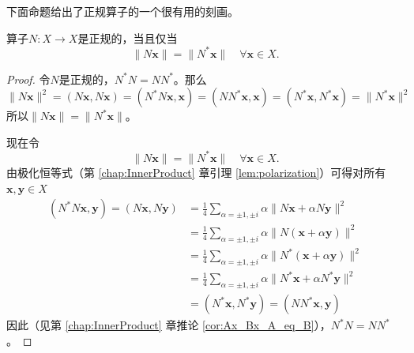 下面命题给出了正规算子的一个很有用的刻画。

\begin{proposition}
    算子$N:X\to X$是正规的，当且仅当\[\|N\mathbf{x}\|=\|N^*\mathbf{x}\|\quad\forall\mathbf{x}\in X.\]
\end{proposition}
\begin{proof}
    令$N$是正规的，$N^*N=NN^*$。那么\[\|N\mathbf{x}\|^2=(N\mathbf{x},N\mathbf{x})=(N^*N\mathbf{x},\mathbf{x})=(NN^*\mathbf{x},\mathbf{x})=(N^*\mathbf{x},N^*\mathbf{x})=\|N^*\mathbf{x}\|^2\]
    所以$\|N\mathbf{x}\|=\|N^{*}\mathbf{x}\|$。

    现在令\[\|N\mathbf{x}\|=\|N^*\mathbf{x}\|\quad\forall\mathbf{x}\in X.\]
    由极化恒等式（第 \ref{chap:InnerProduct} 章引理 \ref{lem:polarization}）可得对所有$\mathbf{x},\mathbf{y}\in X$
    \begin{align*}
        (N^{*}N\mathbf{x},\mathbf{y})=(N\mathbf{x},N\mathbf{y})&=\frac{1}{4}\sum_{\alpha=\pm1,\pm i}\alpha\|N\mathbf{x}+\alpha N\mathbf{y}\|^{2}\\
        &=\frac{1}{4}\sum_{\alpha=\pm1,\pm i}\alpha\|N(\mathbf{x}+\alpha\mathbf{y})\|^2\\
        &=\frac{1}{4}\sum_{\alpha=\pm1,\pm i}\alpha\|N^{*}(\mathbf{x}+\alpha\mathbf{y})\|^{2}\\
        &=\frac{1}{4}\sum_{\alpha=\pm1,\pm i}\alpha\|N^{*}\mathbf{x}+\alpha N^{*}\mathbf{y}\|^{2}\\
        &=(N^*\mathbf{x},N^*\mathbf{y})=(NN^*\mathbf{x},\mathbf{y})
    \end{align*}
    因此（见第 \ref{chap:InnerProduct} 章推论 \ref{cor:Ax_Bx_A_eq_B}），$N^*N=NN^*$。
\end{proof}

